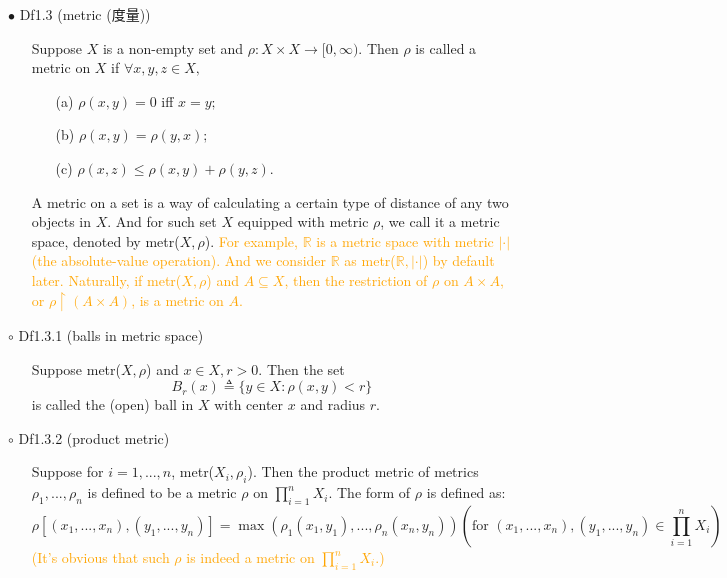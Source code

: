 \documentclass{article}
\begin{document}
{\Large $\bullet $ Df1.3 (metric (度量))}\par
\begin{itemize}
    \item[]
    {\large Suppose $X$ is a non-empty set and $\rho: X\times X\rightarrow [0, \infty)$. 
    Then $\rho$ is called a metric on $X$ if $\forall x, y, z\in X,$
    \begin{enumerate}
        \item[(a)] $\rho(x, y) = 0 $ iff $x = y;$
        \item[(b)] $\rho(x, y) = \rho(y, x);$
        \item[(c)] $\rho(x, z) \leqslant \rho(x, y) + \rho(y, z).$   
    \end{enumerate}}
    {\textcolor{pf}{A metric on a set is a way of calculating a certain type of distance of any two objects in $X$.
    And for such set $X$ equipped with metric $\rho$, we call it a metric space, denoted by metr($X, \rho$).}}
    {\textcolor{orange}{For example, $\mathbb{R}$ is a metric space with metric $|\cdot|$ (the absolute-value operation). 
    \textcolor{pf}{And we consider $\mathbb{R}$ as metr($\mathbb{R},|\cdot|$) by default later.} 
    Naturally, if metr($X, \rho$) and $A \subseteq X$, 
    then the restriction of $\rho$ on $A\times A$, or $\rho \upharpoonright (A\times A)$, is a metric on $A$.}}
\end{itemize}\par
\quad

{\Large $\circ $ Df1.3.1 (balls in metric space)}\par
\begin{itemize}
    \item[]
    {\large Suppose metr($X, \rho$) and $x \in X, r>0$. Then the set
    $$B_r(x)\triangleq \{y\in X: \rho (x, y)<r\}$$
    is called the (open) ball in $X$ with center $x$ and radius $r$.}
\end{itemize}\par
\quad

{\Large $\circ $ Df1.3.2 (product metric)}\par
\begin{itemize}
    \item[]
    {\large Suppose for $i=1,...,n$, metr($X_i, \rho_i$). Then the product metric of 
    metrics $\rho_1,...,\rho_n$ is defined to be a metric $\rho$ on $\prod_{i=1}^n X_i$.
    The form of $\rho$ is defined as:
    $$\rho[(x_1,...,x_n),(y_1,...,y_n)]=\max(\rho_1(x_1,y_1),...,\rho_n(x_n,y_n))
    (\text{for } (x_1,...,x_n),(y_1,...,y_n)\in \prod_{i=1}^n X_i)$$
    \textcolor{orange}{(It's obvious that such $\rho$ is indeed a metric on $\prod_{i=1}^n X_i$.)}}
\end{itemize}\par
\quad
\end{document}
